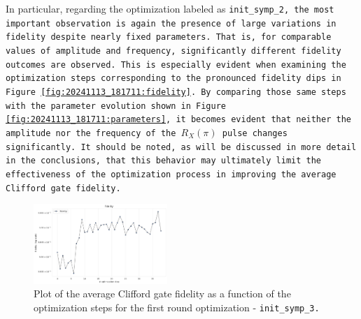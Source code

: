 In particular, regarding the optimization labeled as \tt{init\_symp\_2}, the most important observation is again the presence of large variations in fidelity despite nearly fixed parameters. 
That is, for comparable values of amplitude and frequency, significantly different fidelity outcomes are observed.
This is especially evident when examining the optimization steps corresponding to the pronounced fidelity dips in Figure \ref{fig:20241113_181711:fidelity}.
By comparing those same steps with the parameter evolution shown in Figure \ref{fig:20241113_181711:parameters}, it becomes evident that neither the amplitude nor the frequency of the $R_X(\pi)$ pulse changes significantly. 
It should be noted, as will be discussed in more detail in the conclusions, that this behavior may ultimately limit the effectiveness of the optimization process in improving the average Clifford gate fidelity. 

\begin{figure}[h!]
    \centering
    \includegraphics[width=0.45\textwidth]{figures/png/RB_optimization/NM/InitialSymplex/20241113_200745/fidelity.png}
    \caption{Plot of the average Clifford gate fidelity as a function of the optimization steps for the first round optimization - \tt{init\_symp\_3}.}
    \label{fig:20241113_200745:fidelity}
\end{figure}


